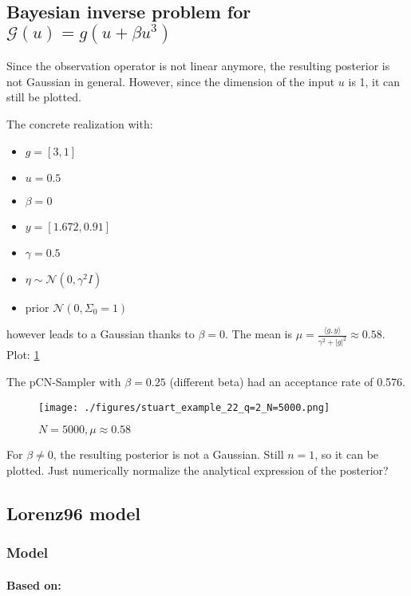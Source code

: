 \documentclass[11pt]{article}
\newcommand{\G}[1]{{\mathcal{G} \left( #1 \right)}}
\newcommand{\N}[2]{\mathcal{N}\left(#1,#2\right)}
\begin{document}
\subsection{Bayesian inverse problem for \(\G{u} = g (u + \beta u^3)\)}
\label{sec:orgadf4988}
Since the observation operator is not linear anymore, the resulting posterior is not
Gaussian in general. However, since the dimension of the input \(u\) is 1, it can
still be plotted.

The concrete realization with:
\begin{itemize}
\item \(g = [3, 1]\)
\item \(u = 0.5\)
\item \(\beta = 0\)
\item \(y= [1.672, 0.91]\)
\item \(\gamma = 0.5\)
\item \(\eta \sim \N{0}{\gamma^2 I}\)
\item prior \(\N{0}{\Sigma_0=1}\)
\end{itemize}
however leads to a Gaussian thanks to \(\beta = 0\). The mean is
\(\mu = \frac{\langle g,y \rangle}{\gamma^2 + |g|^2} \approx 0.58\). Plot: \ref{fig:stuart_22_density}

The pCN-Sampler with \(\beta = 0.25\) (different beta) had an acceptance rate of 0.576.

\begin{figure}[htbp]
\centering
\texttt{[image: ./figures/stuart\_example\_22\_q=2\_N=5000.png]}
\caption{\label{fig:stuart_22_density}
\(N=5000, \mu \approx 0.58\)}
\end{figure}

For \(\beta \neq 0\), the resulting posterior is not a Gaussian. Still \(n=1\), so it can be
plotted. Just numerically normalize the analytical expression of the posterior?

\subsection{Lorenz96 model}
\label{sec:orgf3c962c}
\subsubsection{Model}
\label{sec:orgbadef89}
\paragraph{Based on:}
\label{sec:org9d3e3f6}
\end{document}
